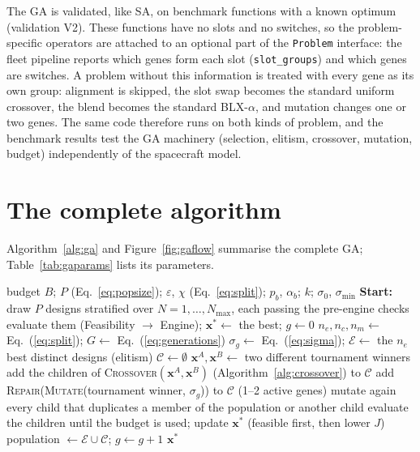 The \ac{GA} is validated, like \ac{SA}, on benchmark functions with a known optimum (validation V2).
These functions have no slots and no switches, so the problem-specific operators are attached to
an optional part of the \texttt{Problem} interface: the fleet pipeline reports which genes form each
slot (\texttt{slot\_groups}) and which genes are switches. A problem without this information is
treated with every gene as its own group: alignment is skipped, the slot swap becomes the standard
uniform crossover, the blend becomes the standard BLX-$\alpha$, and mutation changes one or two
genes. The same code therefore runs on both kinds of problem, and the benchmark results test the
\ac{GA} machinery (selection, elitism, crossover, mutation, budget) independently of the spacecraft
model.

\section{The complete algorithm}
\label{sec:ga-algorithm}

Algorithm~\ref{alg:ga} and Figure~\ref{fig:gaflow} summarise the complete \ac{GA};
Table~\ref{tab:gaparams} lists its parameters.

\begin{algorithm}[htbp]
\caption{Genetic Algorithm for the fleet design}
\label{alg:ga}
\begin{algorithmic}[1]
\REQUIRE budget $B$; $P$ (Eq.~\ref{eq:popsize}); $\varepsilon$, $\chi$ (Eq.~\ref{eq:split}); $p_b$, $\alpha_b$; $k$; $\sigma_0$, $\sigma_{\min}$
\STATE \textbf{Start:} draw $P$ designs stratified over $N=1,\dots,N_{\max}$, each passing the pre-engine checks
\STATE evaluate them (Feasibility $\rightarrow$ Engine); $\mathbf{x}^{*}\leftarrow$ the best; $g\leftarrow0$
\STATE $n_e,n_c,n_m\leftarrow$ Eq.~(\ref{eq:split}); \quad $G\leftarrow$ Eq.~(\ref{eq:generations})
  \STATE $\sigma_g\leftarrow$ Eq.~(\ref{eq:sigma}); \quad $\mathcal{E}\leftarrow$ the $n_e$ best distinct designs \hfill (elitism)
  \STATE $\mathcal{C}\leftarrow\emptyset$
    \STATE $\mathbf{x}^A,\mathbf{x}^B\leftarrow$ two different tournament winners
    \STATE add the children of \textsc{Crossover}$(\mathbf{x}^A,\mathbf{x}^B)$ (Algorithm~\ref{alg:crossover}) to $\mathcal{C}$
  \ENDWHILE
    \STATE add \textsc{Repair}(\textsc{Mutate}(tournament winner, $\sigma_g$)) to $\mathcal{C}$ \hfill (1--2 active genes)
  \ENDFOR
  \STATE mutate again every child that duplicates a member of the population or another child
  \STATE evaluate the children until the budget is used; update $\mathbf{x}^{*}$ (feasible first, then lower $J$)
  \STATE population $\leftarrow\mathcal{E}\cup\mathcal{C}$; \quad $g\leftarrow g+1$
\ENDWHILE
\RETURN $\mathbf{x}^{*}$
\end{algorithmic}
\end{algorithm}

